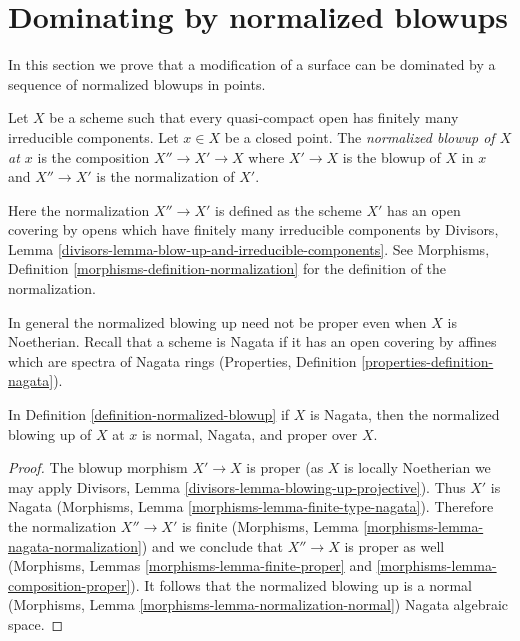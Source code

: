 \section{Dominating by normalized blowups}
\label{section-normalized-blowups}

\noindent
In this section we prove that a modification of a surface can be dominated
by a sequence of normalized blowups in points.

\begin{definition}
\label{definition-normalized-blowup}
Let $X$ be a scheme such that every quasi-compact open has finitely
many irreducible components. Let $x \in X$ be a closed point.
The {\it normalized blowup of $X$ at $x$} is the composition
$X'' \to X' \to X$ where $X' \to X$ is the blowup
of $X$ in $x$ and $X'' \to X'$ is the normalization of $X'$.
\end{definition}

\noindent
Here the normalization $X'' \to X'$ is defined as the scheme $X'$
has an open covering by opens which have finitely many irreducible
components by
Divisors, Lemma \ref{divisors-lemma-blow-up-and-irreducible-components}.
See Morphisms, Definition \ref{morphisms-definition-normalization}
for the definition of the normalization.

\medskip\noindent
In general the normalized blowing up need not be proper even
when $X$ is Noetherian. Recall that a scheme is Nagata if it
has an open covering by affines which are spectra of Nagata rings
(Properties, Definition \ref{properties-definition-nagata}).

\begin{lemma}
\label{lemma-Nagata-normalized-blowup}
In Definition \ref{definition-normalized-blowup} if $X$ is Nagata,
then the normalized blowing up of $X$ at $x$ is
normal, Nagata, and proper over $X$.
\end{lemma}

\begin{proof}
The blowup morphism $X' \to X$ is proper
(as $X$ is locally Noetherian we may apply
Divisors, Lemma \ref{divisors-lemma-blowing-up-projective}).
Thus $X'$ is Nagata
(Morphisms, Lemma \ref{morphisms-lemma-finite-type-nagata}).
Therefore the normalization $X'' \to X'$ is finite
(Morphisms, Lemma \ref{morphisms-lemma-nagata-normalization})
and we conclude that $X'' \to X$ is proper as well
(Morphisms, Lemmas \ref{morphisms-lemma-finite-proper} and
\ref{morphisms-lemma-composition-proper}).
It follows that the normalized blowing up
is a normal (Morphisms, Lemma
\ref{morphisms-lemma-normalization-normal})
Nagata algebraic space.
\end{proof}

